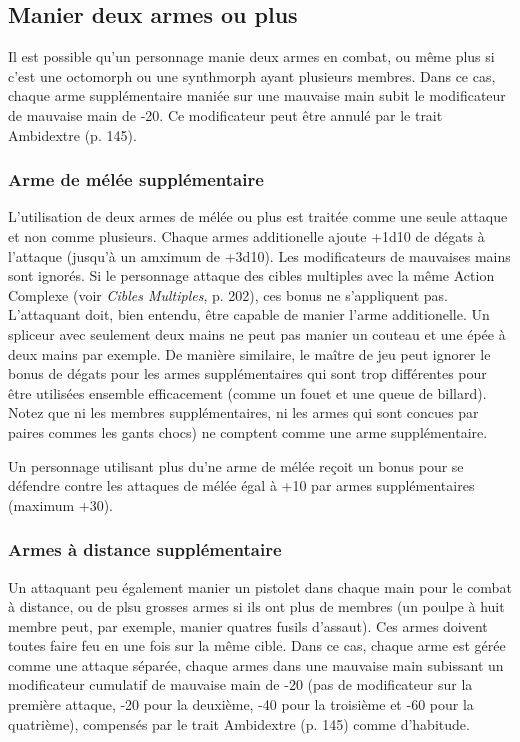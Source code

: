 \subsection{Manier deux armes ou plus} \label{sec:weilding-two-or-more} 

Il est possible qu'un personnage manie deux armes en combat, ou même plus si c'est une octomorph ou une synthmorph ayant plusieurs membres. Dans ce cas, chaque arme supplémentaire maniée sur une mauvaise main subit le modificateur de mauvaise main de -20. Ce modificateur peut être annulé par le trait Ambidextre (p. 145). 

\subsubsection{Arme de mélée supplémentaire} 

L'utilisation de deux armes de mélée ou plus est traitée comme une seule attaque et non comme plusieurs. Chaque armes additionelle ajoute +1d10 de dégats à l'attaque (jusqu'à un amximum de +3d10). Les modificateurs de mauvaises mains sont ignorés. Si le personnage attaque des cibles multiples avec la même Action Complexe (voir \emph{Cibles Multiples}, p. 202), ces bonus ne s'appliquent pas. L'attaquant doit, bien entendu, être capable de manier l'arme additionelle. Un spliceur avec seulement deux mains ne peut pas manier un couteau et une épée à deux mains par exemple. De manière similaire, le maître de jeu peut ignorer le bonus de dégats pour les armes supplémentaires qui sont trop différentes pour être utilisées ensemble efficacement (comme un fouet et une queue de billard). Notez que ni les membres supplémentaires, ni les armes qui sont concues par paires commes les gants chocs) ne comptent comme une arme supplémentaire.  

Un personnage utilisant plus du'ne arme de mélée reçoit un bonus pour se défendre contre les attaques de mélée égal à +10 par armes supplémentaires (maximum +30). 

\subsubsection{Armes à distance supplémentaire} 

Un attaquant peu également manier un pistolet dans chaque main pour le combat à distance, ou de plsu grosses armes si ils ont plus de membres (un poulpe à huit membre peut, par exemple, manier quatres fusils d'assaut). Ces armes doivent toutes faire feu en une fois sur la même cible. Dans ce cas, chaque arme est gérée comme une attaque séparée, chaque armes dans une mauvaise main subissant un modificateur cumulatif de mauvaise main de -20 (pas de modificateur sur la première attaque, -20 pour la deuxième, -40 pour la troisième et -60 pour la quatrième), compensés par le trait Ambidextre (p. 145) comme d'habitude. 

